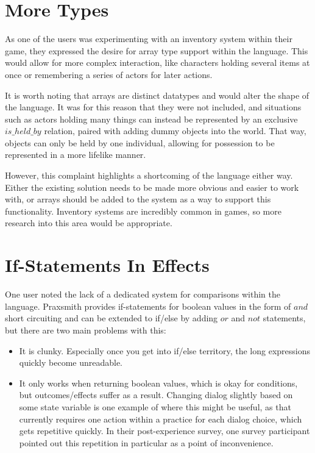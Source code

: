 \section{More Types} \label{sec:MoreTypes}

As one of the users was experimenting with an inventory system within their game,
they expressed the desire for array type support within the language. This would allow
for more complex interaction, like characters holding several items at once or
remembering a series of actors for later actions.

It is worth noting that arrays are distinct datatypes and would alter the shape
of the language. It was for this reason that they were not included, and
situations such as actors holding many things can instead be represented by an
exclusive $is\_held\_by$ relation, paired with adding dummy objects into the world.
That way, objects can only be held by one individual, allowing for possession to
be represented in a more lifelike manner.

However, this complaint highlights a shortcoming of the language either way. Either
the existing solution needs to be made more obvious and easier to work with, or
arrays should be added to the system as a way to support this functionality.
Inventory systems are incredibly common in games, so more research into this area
would be appropriate.

\section{If-Statements In Effects} \label{sec:IfStatementsInEffects}

One user noted the lack of a dedicated system for comparisons within the language.
Praxsmith provides if-statements for boolean values in the form of $and$ short
circuiting and can be extended to if\slash else by adding $or$ and $not$ statements, but
there are two main problems with this:

\begin{itemize}
    \item It is clunky. Especially once you get into if\slash else territory, the long
    expressions quickly become unreadable.
    \item It only works when returning boolean values, which is okay for conditions,
    but outcomes\slash effects suffer as a result. Changing dialog slightly based on some
    state variable is one example of where this might be useful, as that currently
    requires one action within a practice for each dialog choice, which gets
    repetitive quickly. In their post-experience survey, one survey participant pointed
    out this repetition in particular as a point of inconvenience.
\end{itemize}

